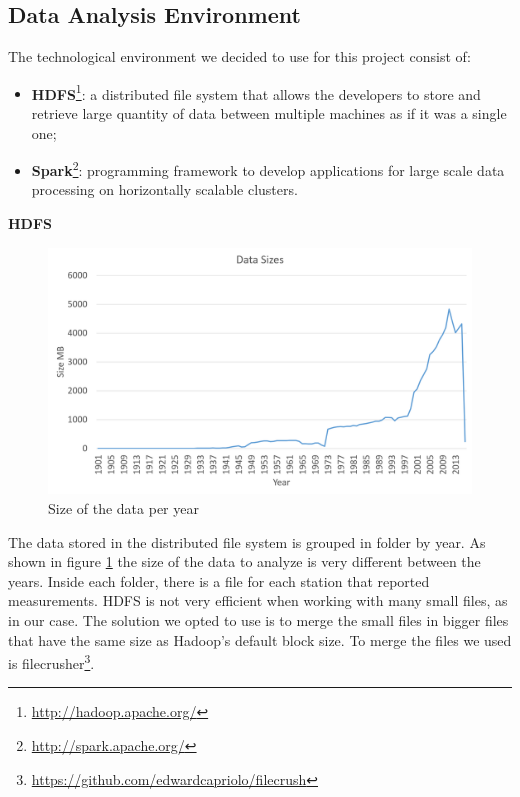 \documentclass{vldb}
\begin{document}
\subsection{Data Analysis Environment}
The technological environment we decided to use for this project consist of:
\begin{itemize}
    \item \textbf{HDFS}\footnote{\href{Hadoop Distributed File System}{http://hadoop.apache.org/}}: a distributed file system that allows the developers to store and retrieve large quantity of data between multiple machines as if it was a single one;
    \item \textbf{Spark}\footnote{\href{Apache Spark}{http://spark.apache.org/}}: programming framework to develop applications for large scale data processing on horizontally scalable clusters.
\end{itemize}

\textbf{HDFS}

\begin{figure}[tbh]
\includegraphics[width=1\linewidth]{dataSize}
\caption{Size of the data per year}
\label{fig:dataSize}
\end{figure}

The data stored in the distributed file system is grouped in folder by year. As shown in figure \ref{fig:dataSize} the size of the data to analyze is very different between the years. Inside each folder, there is a file for each station that reported measurements. HDFS is not very efficient when working with many small files\cite{zhang2012improving}, as in our case. The solution we opted to use is to merge the small files in bigger files that have the same size as Hadoop's default block size. To merge the files we used is filecrusher\footnote{\href{Hadoop Filecrusher}{https://github.com/edwardcapriolo/filecrush}}. \\
\end{document}
